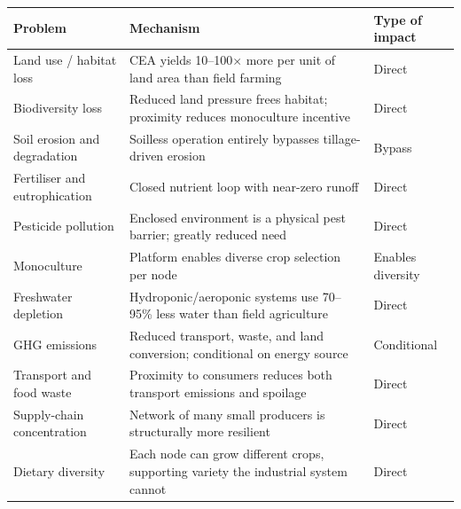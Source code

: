 \begin{center}
\begin{tabular}{p{4.5cm}p{5.5cm}p{3cm}}
\toprule
\textbf{Problem} & \textbf{Mechanism} & \textbf{Type of impact} \\
\midrule
Land use / habitat loss & CEA yields 10--100$\times$ more per unit of land area than field farming & Direct \\
Biodiversity loss & Reduced land pressure frees habitat; proximity reduces monoculture incentive & Direct \\
Soil erosion and degradation & Soilless operation entirely bypasses tillage-driven erosion & Bypass \\
Fertiliser and eutrophication & Closed nutrient loop with near-zero runoff & Direct \\
Pesticide pollution & Enclosed environment is a physical pest barrier; greatly reduced need & Direct \\
Monoculture & Platform enables diverse crop selection per node & Enables diversity \\
Freshwater depletion & Hydroponic/aeroponic systems use 70--95\% less water than field agriculture & Direct \\
GHG emissions & Reduced transport, waste, and land conversion; conditional on energy source & Conditional \\
Transport and food waste & Proximity to consumers reduces both transport emissions and spoilage & Direct \\
Supply-chain concentration & Network of many small producers is structurally more resilient & Direct \\
Dietary diversity & Each node can grow different crops, supporting variety the industrial system cannot & Direct \\
\bottomrule
\end{tabular}
\end{center}

